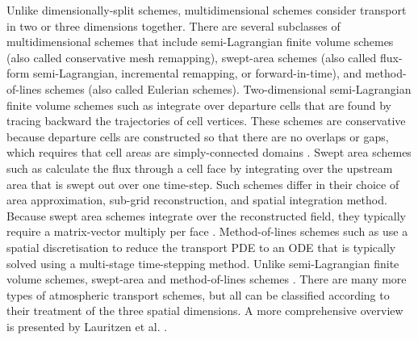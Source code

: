 Unlike dimensionally-split schemes, multidimensional schemes consider transport in two or three dimensions together.
There are several subclasses of multidimensional schemes that include
semi-Lagrangian finite volume schemes (also called conservative mesh remapping),
swept-area schemes (also called flux-form semi-Lagrangian, incremental remapping, or forward-in-time),
and method-of-lines schemes (also called Eulerian schemes).
Two-dimensional semi-Lagrangian finite volume schemes such as \citep{iske-kaeser2004,lauritzen2010} integrate over departure cells that are found by tracing backward the trajectories of cell vertices.  These schemes are conservative because departure cells are constructed so that there are no overlaps or gaps, which requires that cell areas are simply-connected domains \citep{lauritzen2011book}.
Swept area schemes such as \citep{lashley2002,skamarock-menchaca2010,lauritzen2011,thuburn2014} calculate the flux through a cell face by integrating over the upstream area that is swept out over one time-step.  Such schemes differ in their choice of area approximation, sub-grid reconstruction, and spatial integration method.
Because swept area schemes integrate over the reconstructed field, they typically require a matrix-vector multiply per face  \citep{thuburn2014,skamarock-menchaca2010}.
Method-of-lines schemes such as \citep{weller2009,skamarock-gassmann2011} use a spatial discretisation to reduce the transport PDE to an ODE that is typically solved using a multi-stage time-stepping method.
Unlike semi-Lagrangian finite volume schemes, swept-area and method-of-lines schemes .
There are many more types of atmospheric transport schemes, but all can be classified according to their treatment of the three spatial dimensions.  A more comprehensive overview is presented by Lauritzen et al. \cite{lauritzen2014}.

